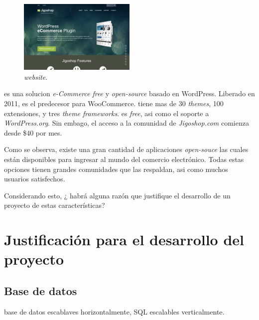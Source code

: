 \subsection{\nameJigoshop}

\begin{figure}[h!]
	\centering
	\includegraphics[width=0.5\textwidth]{figuras/cap1/JigoshopWebsite.jpg}
	\caption{\nameJigoshop \textit{website}\cite{online_Jigoshop}.}
\end{figure}

\nameJigoshop es una solucion \textit{e-Commerce} \textit{free} y \textit{open-source} basado en WordPress. Liberado en 2011, \nameJigoshop es el predecesor para WooCommerce. \nameJigoshop tiene mas de 30   \textit{themes}, 100 extensiones, y tres \textit{theme frameworks}. \nameJigoshop es  \textit{free}, asi como el soporte a \textit{WordPress.org}. Sin embago, el acceso a la comunidad de \textit{Jigoshop.com} comienza desde \$40 por mes.



Como se observa, existe una gran cantidad de aplicaciones \textit{open-souce} las cuales están disponibles para ingresar al mundo del comercio electrónico. Todas estas opciones tienen grandes comunidades que las respaldan, asi como muchos usuarios satisfechos. 

Considerando esto, ¿ habrá alguna razón que justifique el desarrollo de un proyecto de estas características?

\section{Justificación para el desarrollo del proyecto}\label{cap:estadoArte:justificacion_proyecto}


\subsection{Base de datos}

base de datos escablaves horizontalmente, SQL escalables verticalmente.




